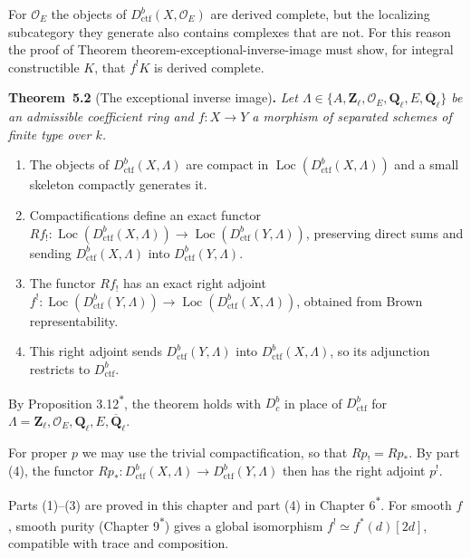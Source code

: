 \documentclass[11pt]{article}
\newenvironment{bpstatement}[2]{\par\addvspace{0.6\baselineskip}\noindent\textbf{#1}#2\textbf{.}\enspace\ignorespaces}
  {\par\addvspace{0.4\baselineskip}}
\newenvironment{bpstatementit}[2]{\begin{bpstatement}{#1}{#2}\itshape\ignorespaces}{\end{bpstatement}}
\newcommand{\bpout}[1]{#1\textsuperscript{\hyperlink{bp-outside}{\ensuremath{\ast}}}}
\providecommand{\Dbc}{}\renewcommand{\Dbc}{D^b_c}
\providecommand{\Loc}{}\renewcommand{\Loc}{\operatorname{Loc}}
\begin{document}
For \(\mathcal O_E\) the objects of \(D^b_{\mathrm{ctf}}(X,\mathcal O_E)\) are derived complete, but the localizing subcategory they generate also contains complexes that are not. For this reason the proof of Theorem theorem-exceptional-inverse-image must show, for integral constructible \(K\), that \(f^!K\) is derived complete.

\label{bp7}%
\begin{bpstatementit}{Theorem~5.2}{ (The exceptional inverse image)}
Let \(\Lambda\in\{A,\mathbf Z_\ell,\mathcal O_E,\mathbf Q_\ell,E,\overline{\mathbf Q}_\ell\}\) be an admissible coefficient ring and \(f:X\to Y\) a morphism of separated schemes of finite type over \(k\).

\begin{enumerate}
\item The objects of \(D^b_{\mathrm{ctf}}(X,\Lambda)\) are compact in \(\Loc(D^b_{\mathrm{ctf}}(X,\Lambda))\) and a small skeleton compactly generates it.
\item Compactifications define an exact functor \(Rf_!:\Loc(D^b_{\mathrm{ctf}}(X,\Lambda))\to\Loc(D^b_{\mathrm{ctf}}(Y,\Lambda))\), preserving direct sums and sending \(D^b_{\mathrm{ctf}}(X,\Lambda)\) into \(D^b_{\mathrm{ctf}}(Y,\Lambda)\).
\item The functor \(Rf_!\) has an exact right adjoint \(f^!:\Loc(D^b_{\mathrm{ctf}}(Y,\Lambda))\to\Loc(D^b_{\mathrm{ctf}}(X,\Lambda))\), obtained from Brown representability.
\item This right adjoint sends \(D^b_{\mathrm{ctf}}(Y,\Lambda)\) into \(D^b_{\mathrm{ctf}}(X,\Lambda)\), so its adjunction restricts to \(D^b_{\mathrm{ctf}}\).
\end{enumerate}
\end{bpstatementit}

\label{bp8}%
By Proposition \bpout{3.12}, the theorem holds with \(\Dbc\) in place of \(D^b_{\mathrm{ctf}}\) for \(\Lambda=\mathbf Z_\ell,\mathcal O_E,\mathbf Q_\ell,E,\overline{\mathbf Q}_\ell\).

For proper \(p\) we may use the trivial compactification, so that \(Rp_!=Rp_*\). By part (4), the functor \(Rp_*:D^b_{\mathrm{ctf}}(X,\Lambda)\to D^b_{\mathrm{ctf}}(Y,\Lambda)\) then has the right adjoint \(p^!\).

Parts (1)–(3) are proved in this chapter and part (4) in Chapter \bpout{6}. For smooth \(f\), smooth purity (Chapter \bpout{9}) gives a global isomorphism \(f^!\simeq f^*(d)[2d]\), compatible with trace and composition.
\end{document}
